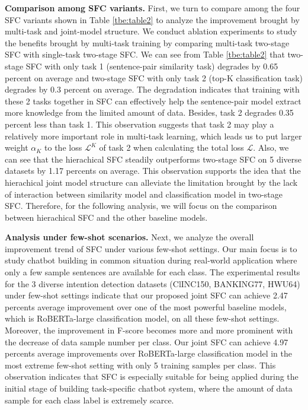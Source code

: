 \documentclass[letterpaper]{article} %
\begin{document}
  \textbf{Comparison  among  SFC  variants.} First, we turn to compare among the
  four  SFC  variants shown in Table \ref{tbe:table2} to analyze the improvement
  brought  by  multi-task  and  joint-model  structure. We conduct
  ablation  experiments  to study the benefits brought by multi-task training by
  comparing multi-task two-stage SFC with single-task two-stage SFC. We can see from
  Table  \ref{tbe:table2}  that  two-stage  SFC  with  only  task 1 (sentence-pair
  similarity task) degrades by 0.65 percent on average and two-stage SFC with only
  task  2  (top-K  classification  task) degrades by 0.3 percent on average. The
  degradation  indicates  that  training  with these 2 tasks together in SFC can
  effectively  help  the  sentence-pair  model  extract  more knowledge from the
  limited  amount  of data. Besides, task 2 degrades 0.35 percent less than task
  1.  This observation suggests that task 2 may play a relatively more important
  role  in multi-task learning, which leads us to put larger weight $\alpha_{K}$
  to  the  loss  $\mathcal{L}^{K}$  of  task  2  when calculating the total loss
  $\mathcal{L}$.  Also, we can see that the hierachical SFC steadily outperforms
  two-stage  SFC  on  5  diverse  datasets  by  1.17  percents  on  average.  This
  observation  supports  the idea that the hierachical joint model structure can
  alleviate the limitation brought by the lack of interaction between similarity
  model  and  classification  model in two-stage SFC. Therefore, for the following
  analysis,  we  will  focus  on  the comparison between hierachical SFC and the
  other baseline models.

  \textbf{Analysis  under  few-shot  scenarios.}  Next,  we  analyze the overall
  improvement trend of SFC under various few-shot settings. Our main focus is to
  study chatbot building in common situation during real-world application where
  only  a  few  sample  sentences are available for each class. The experimental
  results  for  the  3  diverse  intention detection datasets (ClINC150, BANKING77,
  HWU64) under few-shot settings indicate that our proposed joint SFC can
  achieve  2.47  percents  average  improvement  over  one  of the most powerful
  baseline  models,  which  is  RoBERTa-large classification model, on all these
  few-shot  settings. Moreover, the improvement in F-score becomes more and more
  prominent  with the decrease of data sample number per class. Our joint
  SFC   can  achieve  4.97  percents  average  improvements  over  RoBERTa-large
  classification model in the most extreme few-shot setting with only 5 training
  samples  per class. This observation indicates that SFC is especially suitable
  for  being  applied during the initial stage of building task-specific chatbot
  system,  where  the  amount  of  data sample for each class label is extremely
  scarce.
\end{document}
